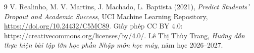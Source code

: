 \begin{thebibliography}{9}
 V. Realinho, M. V. Martins, J. Machado, L. Baptista (2021), \emph{Predict Students' Dropout and Academic Success}, UCI Machine Learning Repository, \url{https://doi.org/10.24432/C5MC89}. Giấy phép CC BY 4.0: \url{https://creativecommons.org/licenses/by/4.0/}.
 Lê Thị Thùy Trang, \emph{Hướng dẫn thực hiện bài tập lớn học phần Nhập môn học máy}, năm học 2026--2027.
\end{thebibliography}
